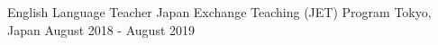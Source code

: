 \begin{cventries}
  \cventry
    {English Language Teacher} %
    {Japan Exchange Teaching (JET) Program} %
    {Tokyo, Japan} %
    {August 2018 - August 2019} %
    {
      \begin{cvitems}
      \end{cvitems}
    }

\end{cventries}

